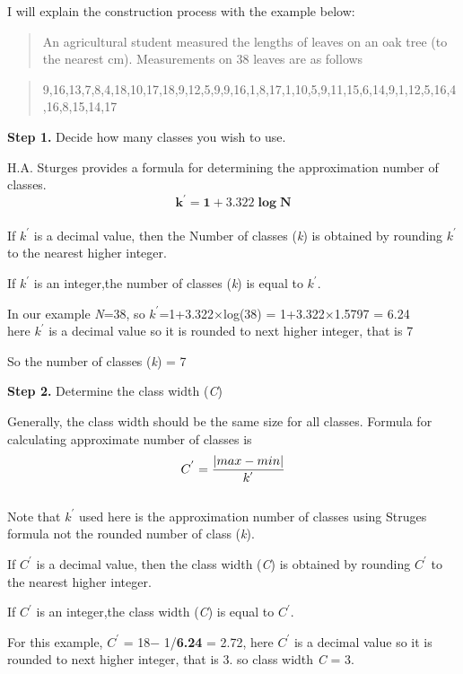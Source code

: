 \documentclass[
]{book}
\begin{document}
I will explain the construction process with the example below:

\begin{quote}
An agricultural student measured the lengths of leaves on an oak tree (to the nearest cm). Measurements on 38 leaves are as follows
\end{quote}

\begin{quote}
9,16,13,7,8,4,18,10,17,18,9,12,5,9,9,16,1,8,17,1,10,5,9,11,15,6,14,9,1,12,5,16,4,16,8,15,14,17
\end{quote}

\textbf{Step 1.} Decide how many classes you wish to use.

H.A. Sturges provides a formula for determining the approximation number
of classes.\\
\[\mathbf{k^{'} = 1 + 3.322}\mathbf{\log}\mathbf{N}\]\\
If \(k^{'}\) is a decimal value, then the Number of classes (\emph{k}) is obtained by rounding \(k^{'}\) to the nearest higher integer.

If \(k^{'}\) is an integer,the number of classes (\emph{k}) is equal to \(k^{'}\).

In our example \emph{N}=38, so \(k^{'}\)=1+3.322×log(38) = 1+3.322×1.5797 = 6.24\\
here \(k^{'}\) is a decimal value so it is rounded to next higher integer, that is 7

So the number of classes (\emph{k}) = 7

\textbf{Step 2.} Determine the class width (\emph{C})

Generally, the class width should be the same size for all classes. Formula for calculating approximate number of classes is\\
\[C^{'} = {| max -min|\over k^{'}}\]\\
Note that \(k^{'}\) used here is the approximation number of classes using Struges formula not the rounded number of class (\emph{k}).

If \(C^{'}\) is a decimal value, then the class width (\emph{C}) is obtained by rounding \(C^{'}\) to the nearest higher integer.

If \(C^{'}\) is an integer,the class width (\emph{C}) is equal to \(C^{'}\).

For this example, \(C^{'}\) = \textbar{} 18− 1\textbar/\textbf{6.24} = 2.72, here \(C^{'}\) is a decimal value so it is rounded to next higher integer, that is 3. so class width \emph{C} = 3.
\end{document}
